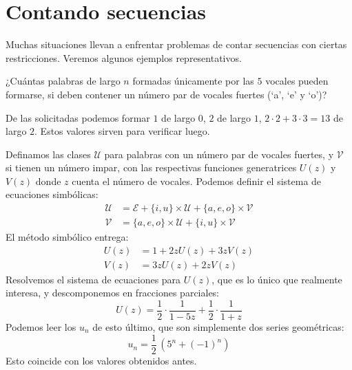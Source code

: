 \section{Contando secuencias}
\label{sec:ejemplos-secuencias}

  Muchas situaciones
  llevan a enfrentar problemas de contar secuencias
  con ciertas restricciones.
  Veremos algunos ejemplos representativos.

  ¿Cuántas palabras de largo \(n\)
  formadas únicamente por las \(5\) vocales
  pueden formarse,
  si deben contener un número par de vocales fuertes
  (`a', `e' y `o')?

  De las solicitadas podemos formar \(1\) de largo \(0\),
  \(2\) de largo \(1\),
  \(2 \cdot 2 + 3 \cdot 3 = 13\) de largo \(2\).
  Estos valores sirven para verificar luego.

  Definamos las clases \(\mathcal{U}\)
  para palabras con un número par
  de vocales fuertes,
  y \(\mathcal{V}\) si tienen un número impar,
  con las respectivas funciones generatrices \(U(z)\) y \(V(z)\)
  donde \(z\) cuenta el número de vocales.
  Podemos definir el sistema de ecuaciones simbólicas:
  \begin{align*}
    \mathcal{U}
      &= \mathcal{E}
	    + \{i, u\} \times \mathcal{U}
	    + \{a, e, o\} \times \mathcal{V} \\
    \mathcal{V}
      &= \{a, e, o\} \times \mathcal{U}
	    + \{i, u\} \times \mathcal{V}
  \end{align*}
  El método simbólico entrega:%
  \begin{align*}
    U(z)
      &= 1 + 2 z U(z) + 3 z V(z) \\
    V(z)
      &= 3 z U(z) + 2 z V(z)
  \end{align*}
  Resolvemos el sistema de ecuaciones para \(U(z)\),
  que es lo único que realmente interesa,
  y descomponemos en fracciones parciales:
  \begin{equation*}
    U(z)
      = \frac{1}{2} \cdot \frac{1}{1 - 5 z}
	  + \frac{1}{2} \cdot \frac{1}{1 + z}
  \end{equation*}
  Podemos leer los \(u_n\) de esto último,
  que son simplemente dos series geométricas:
  \begin{equation*}
    u_n = \frac{1}{2} \,\left( 5^n + (-1)^n \right)
  \end{equation*}
  Esto coincide con los valores obtenidos antes.

